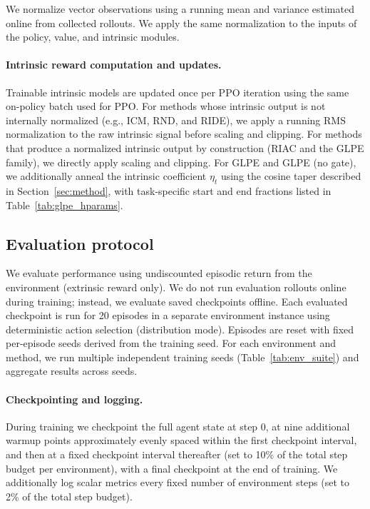 We normalize vector observations using a running mean and variance estimated online from collected rollouts.
We apply the same normalization to the inputs of the policy, value, and intrinsic modules.

\paragraph{Intrinsic reward computation and updates.}
Trainable intrinsic models are updated once per PPO iteration using the same on-policy batch used for PPO.
For methods whose intrinsic output is not internally normalized (e.g., ICM, RND, and RIDE), we apply a running RMS normalization to the raw intrinsic signal before scaling and clipping.
For methods that produce a normalized intrinsic output by construction (RIAC and the GLPE family), we directly apply scaling and clipping.
For GLPE and GLPE (no gate), we additionally anneal the intrinsic coefficient $\eta_t$ using the cosine taper described in Section~\ref{sec:method}, with task-specific start and end fractions listed in Table~\ref{tab:glpe_hparams}.

\subsection{Evaluation protocol}
\label{sec:experimental_setup:evaluation}

We evaluate performance using undiscounted episodic return from the environment (extrinsic reward only).
We do not run evaluation rollouts online during training; instead, we evaluate saved checkpoints offline.
Each evaluated checkpoint is run for 20 episodes in a separate environment instance using deterministic action selection (distribution mode).
Episodes are reset with fixed per-episode seeds derived from the training seed.
For each environment and method, we run multiple independent training seeds (Table~\ref{tab:env_suite}) and aggregate results across seeds.

\paragraph{Checkpointing and logging.}
During training we checkpoint the full agent state at step 0, at nine additional warmup points approximately evenly spaced within the first checkpoint interval, and then at a fixed checkpoint interval thereafter (set to 10\% of the total step budget per environment), with a final checkpoint at the end of training.
We additionally log scalar metrics every fixed number of environment steps (set to 2\% of the total step budget).

